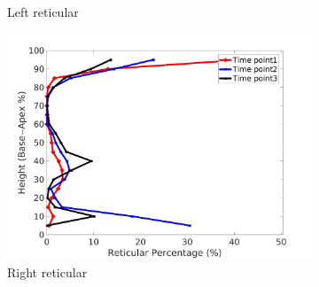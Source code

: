 \begin{figure}[H]
\begin{subfigure}{.42\linewidth}
  \caption{Left reticular}
  \label{fig:IPF21DiseaseAgainstHeight-c} 
\end{subfigure} 
\begin{subfigure}{.42\linewidth}%
  \includegraphics[width=\linewidth,trim={{.0\wd0} {.0\wd0} {.0\wd0} {.0\wd0}},clip]{Appendix/Image_AppexA/BaseToApex/IPF21RightLungReticularDiseaseAgainstHeight.jpg}
  \caption{Right reticular}
  \label{fig:IPF21DiseaseAgainstHeight-d}
\end{subfigure}
\begin{subfigure}{.42\linewidth}%

\end{subfigure}
\end{figure}
